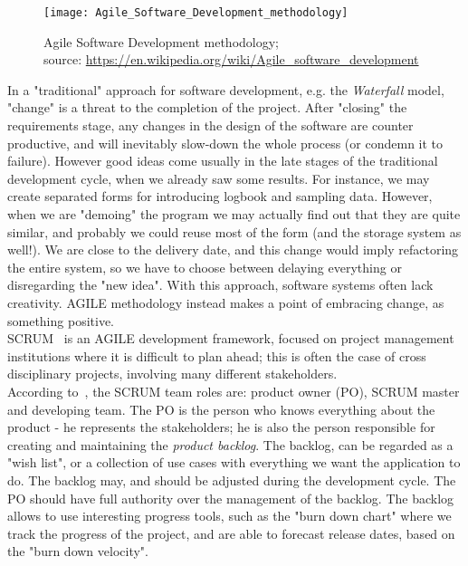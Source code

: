 \documentclass[11pt]{article} %
\begin{document}
  \begin{figure}[!ht]%
    \begin{center} 
	\texttt{[image: Agile\_Software\_Development\_methodology]}
      \caption[Agile Software Development methodology;]
{Agile Software Development methodology;\\ source: \url{https://en.wikipedia.org/wiki/Agile_software_development}}
      \label{agile-pic} %
    \end{center} 
  \end{figure}

In a "traditional" approach for software development, e.g. the \emph{Waterfall} model, "change" is a threat to the completion of the project. After "closing" the requirements stage, any changes in the design of the software are counter productive, and will inevitably slow-down the whole process (or condemn it to failure). However good ideas come usually in the late stages of the traditional development cycle, when we already saw some results. For instance, we may create separated forms for introducing logbook and sampling data. However, when we are "demoing" the program we may actually find out that they are quite similar, and probably we could reuse most of the form (and the storage system as well!). We are close to the delivery date, and this change would imply refactoring the entire system, so we have to choose between delaying everything or disregarding the "new idea". With this approach, software systems often lack creativity. AGILE methodology instead makes a point of embracing change, as something 
positive.\\
SCRUM~\cite{scrum} is an AGILE development framework, focused on project management institutions where it is difficult to plan ahead; this is often the case of cross disciplinary projects, involving many different stakeholders.\\
According to~\cite{scrum_guide}, the SCRUM team roles are: product owner (PO), SCRUM master and developing team. The PO is the person who knows everything about the product - he represents the stakeholders; he is also the person responsible for creating and maintaining the \emph{product backlog}. The backlog, can be regarded as a "wish list", or a collection of use cases with everything we want the application to do. The backlog may, and should be adjusted during the development cycle. The PO should have full authority over the management of the backlog. The backlog allows to use interesting progress tools, such as the "burn down chart" where we track the progress of the project, and are able to forecast release dates, based on the "burn down velocity".\\
\end{document}
